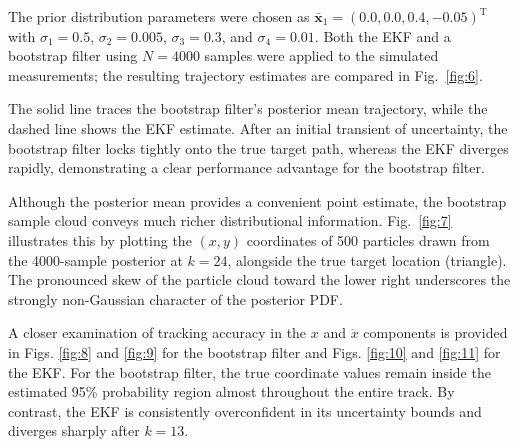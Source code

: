 
The prior distribution parameters were chosen as $\bar{\bm{x}}_1 = (0.0, 0.0, 0.4, -0.05)^{\mathrm{T}}$ with $\sigma_1 = 0.5$, $\sigma_2 = 0.005$, $\sigma_3 = 0.3$, and $\sigma_4 = 0.01$. Both the EKF and a bootstrap filter using $N = 4000$ samples were applied to the simulated measurements; the resulting trajectory estimates are compared in Fig.~\ref{fig:6}.

The solid line traces the bootstrap filter's posterior mean trajectory, while the dashed line shows the EKF estimate. After an initial transient of uncertainty, the bootstrap filter locks tightly onto the true target path, whereas the EKF diverges rapidly, demonstrating a clear performance advantage for the bootstrap filter.

Although the posterior mean provides a convenient point estimate, the bootstrap sample cloud conveys much richer distributional information. Fig.~\ref{fig:7} illustrates this by plotting the $(x, y)$ coordinates of 500 particles drawn from the 4000-sample posterior at $k = 24$, alongside the true target location (triangle). The pronounced skew of the particle cloud toward the lower right underscores the strongly non-Gaussian character of the posterior PDF.



A closer examination of tracking accuracy in the $x$ and $\dot{x}$ components is provided in Figs. \ref{fig:8} and \ref{fig:9} for the bootstrap filter and Figs. \ref{fig:10} and \ref{fig:11} for the EKF. For the bootstrap filter, the true coordinate values remain inside the estimated 95\% probability region almost throughout the entire track. By contrast, the EKF is consistently overconfident in its uncertainty bounds and diverges sharply after $k = 13$.



